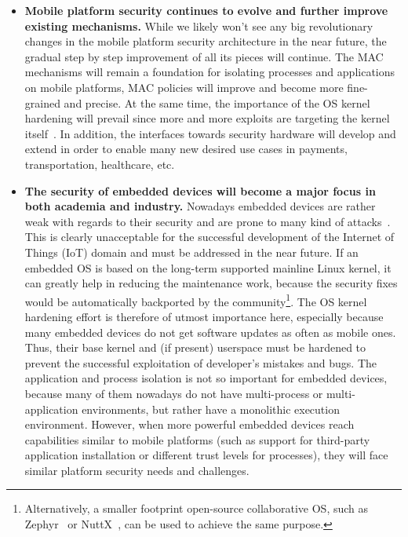 \begin{itemize}
	\item \textbf{Mobile platform security continues to evolve and further improve existing mechanisms.} While we likely won't see any big revolutionary changes in the mobile platform security architecture in the near future, the gradual step by step improvement of all its pieces will continue. The MAC mechanisms will remain a foundation for isolating processes and applications on mobile platforms, MAC policies will improve and become more fine-grained and precise. At the same time, the importance of the OS kernel hardening will prevail since more and more exploits are targeting the kernel itself~\cite{stoep2016android}. In addition, the interfaces towards security hardware will develop and extend in order to enable many new desired use cases in payments, transportation, healthcare, etc.
		
	\item \textbf{The security of embedded devices will become a major focus in both academia and industry.} Nowadays embedded devices are rather weak with regards to their security and are prone to many kind of attacks~\cite{Choo2016}. This is clearly unacceptable for the successful development of the Internet of Things (IoT) domain and must be addressed in the near future. If an embedded OS is based on the long-term supported mainline Linux kernel, it can greatly help in reducing the maintenance work, because the security fixes would be automatically backported by the community\footnote{Alternatively, a smaller footprint open-source collaborative OS, such as Zephyr~\cite{zephyr} or NuttX~\cite{NuttX}, can be used to achieve the same purpose.}. The OS kernel hardening effort is therefore of utmost importance here, especially because many embedded devices do not get software updates as often as mobile ones. Thus, their base kernel and (if present) userspace must be hardened to prevent the successful exploitation of developer's mistakes and bugs. The application and process isolation is not so important for embedded devices, because many of them nowadays do not have multi-process or multi-application environments, but rather have a monolithic execution environment. However, when more powerful embedded devices reach capabilities similar to mobile platforms (such as support for third-party application installation or different trust levels for processes), they will face similar platform security needs and challenges.
	

\end{itemize}
